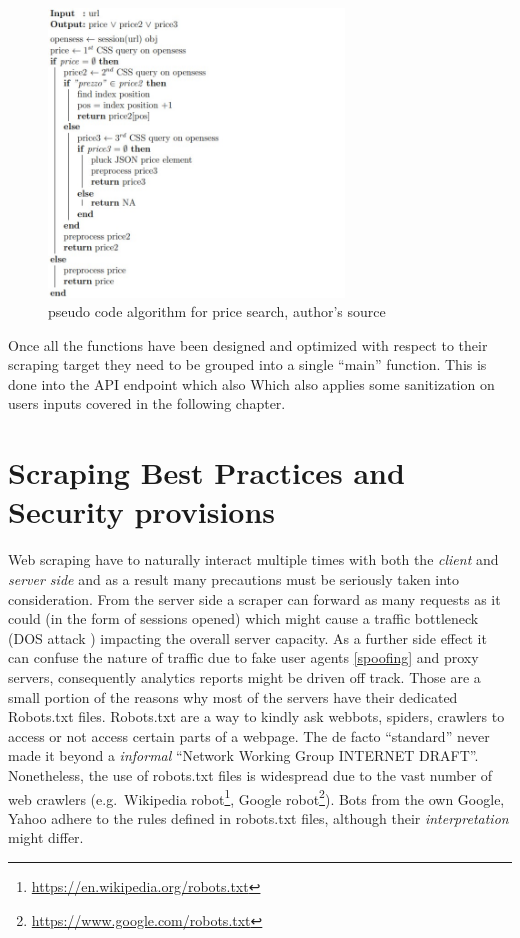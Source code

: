 \documentclass[
  12pt,
  a4paper,
  oneside]{book}
\DeclareRobustCommand{\href}[2]{#2\footnote{\url{#1}}}
\theoremstyle{definition}
\theoremstyle{definition}
\theoremstyle{definition}
\theoremstyle{remark}
\begin{document}
\begin{figure}
\centering
\includegraphics[width=0.7\textwidth,height=\textheight]{images/pseudocode_latex/pseudocode_price.jpg}
\caption{\label{fig:pseudocode1}pseudo code algorithm for price search, author's source}
\end{figure}

Once all the functions have been designed and optimized with respect to their scraping target they need to be grouped into a single ``main'' function. This is done into the API endpoint which also Which also applies some sanitization on users inputs covered in the following chapter.

\hypertarget{best-practices}{%
\section{Scraping Best Practices and Security provisions}\label{best-practices}}

Web scraping have to naturally interact multiple times with both the \emph{client} and \emph{server side} and as a result many precautions must be seriously taken into consideration. From the server side a scraper can forward as many requests as it could (in the form of sessions opened) which might cause a traffic bottleneck (DOS attack \citet{wiki:DOS}) impacting the overall server capacity. As a further side effect it can confuse the nature of traffic due to fake user agents \ref{spoofing} and proxy servers, consequently analytics reports might be driven off track.
Those are a small portion of the reasons why most of the servers have their dedicated Robots.txt files. Robots.txt \citet{meissner_2020} are a way to kindly ask webbots, spiders, crawlers to access or not access certain parts of a webpage. The de facto ``standard'' never made it beyond a \emph{informal} ``Network Working Group INTERNET DRAFT''. Nonetheless, the use of robots.txt files is widespread due to the vast number of web crawlers (e.g.~\href{https://en.wikipedia.org/robots.txt}{Wikipedia robot}, \href{https://www.google.com/robots.txt}{Google robot}). Bots from the own Google, Yahoo adhere to the rules defined in robots.txt files, although their \emph{interpretation} might differ.
\end{document}

